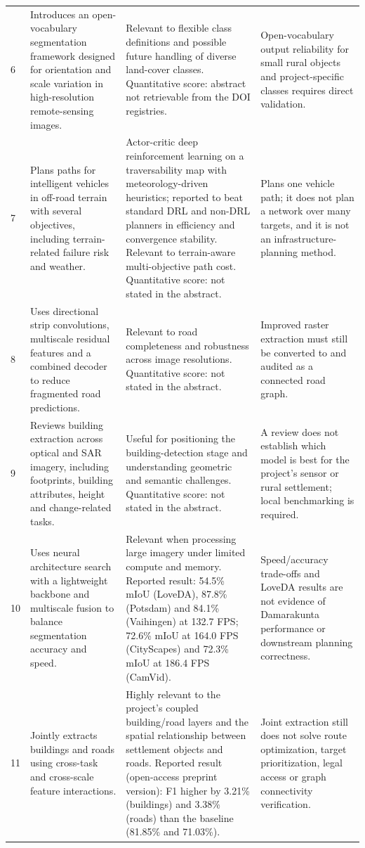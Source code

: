 \begin{landscape}
\begin{longtable}{@{}L{0.6cm}L{7.5cm}L{8.0cm}L{7.5cm}@{}}
6 & Introduces an open-vocabulary segmentation framework designed for orientation and scale variation in high-resolution remote-sensing images. & Relevant to flexible class definitions and possible future handling of diverse land-cover classes. Quantitative score: abstract not retrievable from the DOI registries. & Open-vocabulary output reliability for small rural objects and project-specific classes requires direct validation.  \\
7 & Plans paths for intelligent vehicles in off-road terrain with several objectives, including terrain-related failure risk and weather. & Actor-critic deep reinforcement learning on a traversability map with meteorology-driven heuristics; reported to beat standard DRL and non-DRL planners in efficiency and convergence stability. Relevant to terrain-aware multi-objective path cost. Quantitative score: not stated in the abstract. & Plans one vehicle path; it does not plan a network over many targets, and it is not an infrastructure-planning method.  \\
8 & Uses directional strip convolutions, multiscale residual features and a combined decoder to reduce fragmented road predictions. & Relevant to road completeness and robustness across image resolutions. Quantitative score: not stated in the abstract. & Improved raster extraction must still be converted to and audited as a connected road graph.  \\
9 & Reviews building extraction across optical and SAR imagery, including footprints, building attributes, height and change-related tasks. & Useful for positioning the building-detection stage and understanding geometric and semantic challenges. Quantitative score: not stated in the abstract. & A review does not establish which model is best for the project's sensor or rural settlement; local benchmarking is required.  \\
10 & Uses neural architecture search with a lightweight backbone and multiscale fusion to balance segmentation accuracy and speed. & Relevant when processing large imagery under limited compute and memory. Reported result: 54.5\% mIoU (LoveDA), 87.8\% (Potsdam) and 84.1\% (Vaihingen) at 132.7 FPS; 72.6\% mIoU at 164.0 FPS (CityScapes) and 72.3\% mIoU at 186.4 FPS (CamVid). & Speed/accuracy trade-offs and LoveDA results are not evidence of Damarakunta performance or downstream planning correctness.  \\
11 & Jointly extracts buildings and roads using cross-task and cross-scale feature interactions. & Highly relevant to the project's coupled building/road layers and the spatial relationship between settlement objects and roads. Reported result (open-access preprint version): F1 higher by 3.21\% (buildings) and 3.38\% (roads) than the baseline (81.85\% and 71.03\%). & Joint extraction still does not solve route optimization, target prioritization, legal access or graph connectivity verification.  \\

\end{longtable}
\end{landscape}
